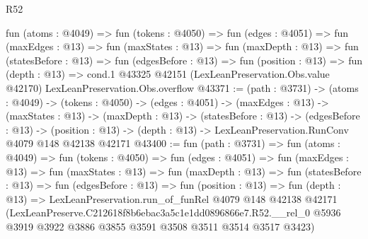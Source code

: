 \begin{lexlean}{R52}
\begin{coremodule}
  fun (atoms : @4049) =>
  fun (tokens : @4050) =>
  fun (edges : @4051) =>
  fun (maxEdges : @13) =>
  fun (maxStates : @13) =>
  fun (maxDepth : @13) =>
  fun (statesBefore : @13) =>
  fun (edgesBefore : @13) =>
  fun (position : @13) =>
  fun (depth : @13) =>
  cond.{1} @43325 @42151 (LexLeanPreservation.Obs.value @42170) LexLeanPreservation.Obs.overflow
@43371 := (path : @3731) ->
  (atoms : @4049) ->
  (tokens : @4050) ->
  (edges : @4051) ->
  (maxEdges : @13) ->
  (maxStates : @13) ->
  (maxDepth : @13) ->
  (statesBefore : @13) ->
  (edgesBefore : @13) ->
  (position : @13) -> (depth : @13) -> LexLeanPreservation.RunConv @4079 @148 @42138 @42171
@43400 := fun (path : @3731) =>
  fun (atoms : @4049) =>
  fun (tokens : @4050) =>
  fun (edges : @4051) =>
  fun (maxEdges : @13) =>
  fun (maxStates : @13) =>
  fun (maxDepth : @13) =>
  fun (statesBefore : @13) =>
  fun (edgesBefore : @13) =>
  fun (position : @13) =>
  fun (depth : @13) =>
  LexLeanPreservation.run_of_funRel
    @4079
    @148
    @42138
    @42171
    (LexLeanPreserve.C212618f8b6ebac3a5c1e1dd0896866e7.R52.__rel_0
      @5936
      @3919
      @3922
      @3886
      @3855
      @3591
      @3508
      @3511
      @3514
      @3517
      @3423)
\end{coremodule}
\end{lexlean}
